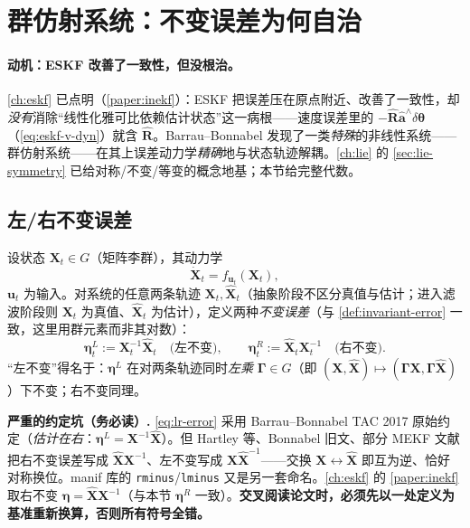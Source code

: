 \section{群仿射系统：不变误差为何自治}
\label{sec:group-affine}

\paragraph{动机：ESKF 改善了一致性，但没根治。}
\cref{ch:eskf} 已点明（\cref{paper:inekf}）：ESKF 把误差压在原点附近、改善了一致性，却\emph{没有}消除“线性化雅可比依赖估计状态”这一病根——速度误差里的 $-\hat{\mathbf{R}}\hat{\mathbf{a}}^\wedge\delta\boldsymbol{\theta}$（\cref{eq:eskf-v-dyn}）就含 $\hat{\mathbf{R}}$。Barrau--Bonnabel\cite{barrau2017invariant} 发现了一类\emph{特殊}的非线性系统——群仿射系统——在其上误差动力学\emph{精确}地与状态轨迹解耦。\cref{ch:lie} 的 \cref{sec:lie-symmetry} 已给对称/不变/等变的概念地基；本节给完整代数。

\subsection{左/右不变误差}
\label{subsec:invariant-error}

设状态 $\mathbf{X}_t\in G$（矩阵李群），其动力学
\begin{equation}
  \dot{\mathbf{X}}_t=f_{\mathbf{u}_t}(\mathbf{X}_t),
  \label{eq:ga-dynamics}
\end{equation}
$\mathbf{u}_t$ 为输入。对系统的任意两条轨迹 $\mathbf{X}_t,\hat{\mathbf{X}}_t$（抽象阶段不区分真值与估计；进入滤波阶段则 $\mathbf{X}_t$ 为真值、$\hat{\mathbf{X}}_t$ 为估计），定义两种\emph{不变误差}（与 \cref{def:invariant-error} 一致，这里用群元素而非其对数）：
\begin{equation}
  \boldsymbol{\eta}^L_t:=\mathbf{X}_t^{-1}\hat{\mathbf{X}}_t\quad\text{(左不变)},\qquad
  \boldsymbol{\eta}^R_t:=\hat{\mathbf{X}}_t\mathbf{X}_t^{-1}\quad\text{(右不变)}.
  \label{eq:lr-error}
\end{equation}
“左不变”得名于：$\boldsymbol{\eta}^L$ 在对两条轨迹同时\emph{左乘} $\boldsymbol{\Gamma}\in G$（即 $(\mathbf{X},\hat{\mathbf{X}})\mapsto(\boldsymbol{\Gamma}\mathbf{X},\boldsymbol{\Gamma}\hat{\mathbf{X}})$）下不变；右不变同理。

\begin{note}
\textbf{严重的约定坑（务必读）.}\;
\cref{eq:lr-error} 采用 Barrau--Bonnabel TAC 2017 原始约定（\emph{估计在右}：$\boldsymbol{\eta}^L=\mathbf{X}^{-1}\hat{\mathbf{X}}$）。但 Hartley 等\cite{hartley2020contact}、Bonnabel 旧文、部分 MEKF 文献把右不变误差写成 $\hat{\mathbf{X}}\mathbf{X}^{-1}$、左不变写成 $\mathbf{X}\hat{\mathbf{X}}^{-1}$——交换 $\mathbf{X}\leftrightarrow\hat{\mathbf{X}}$ 即互为逆、恰好对称换位。manif 库的 \texttt{rminus}/\allowbreak\texttt{lminus} 又是另一套命名。\cref{ch:eskf} 的 \cref{paper:inekf} 取右不变 $\boldsymbol{\eta}=\hat{\mathbf{X}}\mathbf{X}^{-1}$（与本节 $\boldsymbol{\eta}^R$ 一致）。\textbf{交叉阅读论文时，必须先以一处定义为基准重新换算，否则所有符号全错。}
\end{note}


